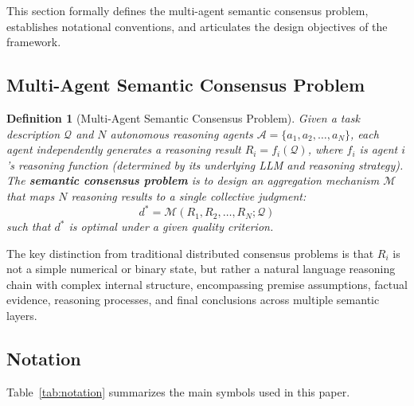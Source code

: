 \documentclass[12pt,a4paper]{article}
\newtheorem{definition}{Definition}[section]
\begin{document}
This section formally defines the multi-agent semantic consensus problem, establishes notational conventions, and articulates the design objectives of the framework.

\subsection{Multi-Agent Semantic Consensus Problem}

\begin{definition}[Multi-Agent Semantic Consensus Problem]\label{def:consensus}
Given a task description $\mathcal{Q}$ and $N$ autonomous reasoning agents $\mathcal{A} = \{a_1, a_2, \ldots, a_N\}$, each agent independently generates a reasoning result $R_i = f_i(\mathcal{Q})$, where $f_i$ is agent $i$'s reasoning function (determined by its underlying LLM and reasoning strategy). The \textbf{semantic consensus problem} is to design an aggregation mechanism $\mathcal{M}$ that maps $N$ reasoning results to a single collective judgment:
\begin{equation}
d^* = \mathcal{M}(R_1, R_2, \ldots, R_N; \mathcal{Q})
\end{equation}
such that $d^*$ is optimal under a given quality criterion.
\end{definition}

The key distinction from traditional distributed consensus problems is that $R_i$ is not a simple numerical or binary state, but rather a natural language reasoning chain with complex internal structure, encompassing premise assumptions, factual evidence, reasoning processes, and final conclusions across multiple semantic layers.

\subsection{Notation}

Table~\ref{tab:notation} summarizes the main symbols used in this paper.
\end{document}

